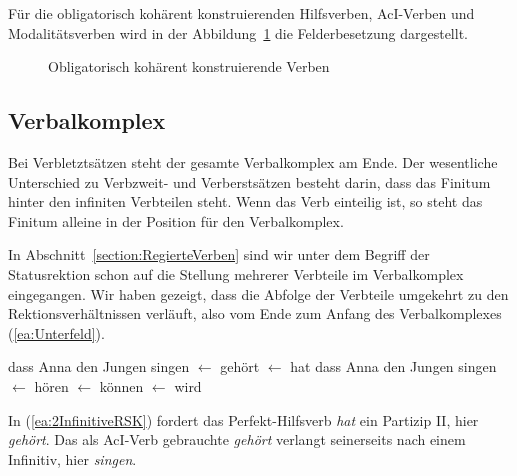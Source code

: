 Für die obligatorisch kohärent konstruierenden Hilfsverben, AcI-Verben und Modalitätsverben wird in der Abbildung~\ref{fig:Kohärente_Konstruktionen} die Felderbesetzung dargestellt.

\begin{figure}[!htbp]
  \centering
  \caption{Obligatorisch kohärent konstruierende Verben}
  \label{fig:Kohärente_Konstruktionen}
\end{figure} 

\newpage
\subsection{Verbalkomplex}\label{subsection:RechteSatzklammer}

Bei Verbletztsätzen steht der gesamte Verbalkomplex am Ende. Der wesentliche Unterschied zu Verbzweit- und Verberstsätzen besteht darin, dass das Finitum hinter den infiniten Verbteilen steht. Wenn das Verb einteilig ist, so steht das Finitum alleine in der Position für den Verbalkomplex.

In Abschnitt~\ref{section:RegierteVerben} sind wir unter dem Begriff der Statusrektion schon auf die Stellung mehrerer Verbteile im Verbalkomplex eingegangen. Wir haben gezeigt, dass die Abfolge der Verbteile umgekehrt zu den Rektionsverhältnissen verläuft, also vom Ende zum Anfang des Verbalkomplexes (\ref{ea:Unterfeld}). 

 \ea \label{ea:Unterfeld}
 \ea \label{ea:2InfinitiveRSK} dass Anna den Jungen singen $\leftarrow$ gehört $\leftarrow$ hat
 \ex \label{ex:2InfinitiveRSK2} dass Anna den Jungen singen $\leftarrow$ hören $\leftarrow$ können $\leftarrow$ wird
 \z 
 \z 

In (\ref{ea:2InfinitiveRSK}) fordert das Perfekt-Hilfsverb \textit{hat} ein Partizip II, hier \textit{gehört}. Das als AcI-Verb gebrauchte \textit{gehört} verlangt seinerseits nach einem Infinitiv, hier \textit{singen}.


